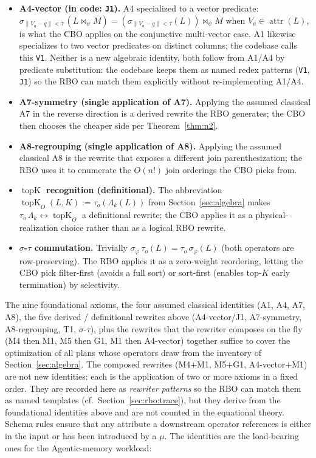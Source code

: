 \documentclass[sigconf]{acmart}
\theoremstyle{plain}
\theoremstyle{definition}
\newcommand{\attr}[1]{\operatorname{attr}(#1)}
\newcommand{\topK}{\operatorname{topK}}
\theoremstyle{remark}
\begin{document}
\begin{itemize}[leftmargin=*]
  \item \textbf{A4-vector (in code: \texttt{J1}).} A4 specialized
    to a vector predicate:
    $\sigma_{\lVert V_a - q \rVert < \tau}\,(L \bowtie_\psi M) =
    (\sigma_{\lVert V_a - q \rVert < \tau}(L)) \bowtie_\psi M$
    when $V_a \in \attr{L}$, is what the CBO applies on the
    conjunctive multi-vector case. A1 likewise specializes to
    two vector predicates on distinct columns; the codebase
    calls this \texttt{V1}. Neither is a new algebraic identity,
    both follow from A1/A4 by predicate substitution: the
    codebase keeps them as named redex patterns (\texttt{V1},
    \texttt{J1}) so the RBO can match them explicitly without
    re-implementing A1/A4.
  \item \textbf{A7-symmetry (single application of A7).}
    Applying the assumed classical A7 in the reverse direction
    is a derived rewrite the RBO generates; the CBO then chooses
    the cheaper side per Theorem~\ref{thm:n2}.
  \item \textbf{A8-regrouping (single application of A8).}
    Applying the assumed classical A8 is the rewrite that exposes
    a different join parenthesization; the RBO uses it to
    enumerate the $O(n!)$ join orderings the CBO picks from.
  \item \textbf{$\topK$ recognition (definitional).} The
    abbreviation $\topK_O(L, K):= \tau_o(\Lambda_k(L))$ from
    Section~\ref{sec:algebra} makes
    $\tau_o\,\Lambda_k \leftrightarrow \topK_O$ a definitional
    rewrite; the CBO applies it as a physical-realization choice
    rather than as a logical RBO rewrite.
  \item \textbf{$\sigma$-$\tau$ commutation.} Trivially
    $\sigma_\varphi\,\tau_o(L) = \tau_o\,\sigma_\varphi(L)$
    (both operators are row-preserving). The RBO applies it as a
    zero-weight reordering, letting the CBO pick filter-first
    (avoids a full sort) or sort-first (enables top-$K$ early
    termination) by selectivity.
\end{itemize}

The nine foundational axioms, the four assumed classical identities
(A1, A4, A7, A8), the five derived / definitional rewrites above
(A4-vector/J1, A7-symmetry, A8-regrouping, T1, $\sigma$-$\tau$),
plus the rewrites that the rewriter composes on the fly (M4 then
M1, M5 then G1, M1 then A4-vector) together suffice to cover
the optimization of all plans whose operators draw from the
inventory of Section~\ref{sec:algebra}. The composed rewrites
(M4+M1, M5+G1, A4-vector+M1) are not new identities: each is
the application of two or more axioms in a fixed order. They are
recorded here as \emph{rewriter patterns} so the RBO can match
them as named templates (cf.\ Section~\ref{sec:rbo:trace}), but
they derive from the foundational identities above and are not
counted in the equational theory. Schema rules ensure that any
attribute a downstream operator references is either in the
input or has been introduced by a $\mu$. The identities are the
load-bearing ones for the Agentic-memory workload:
\end{document}
